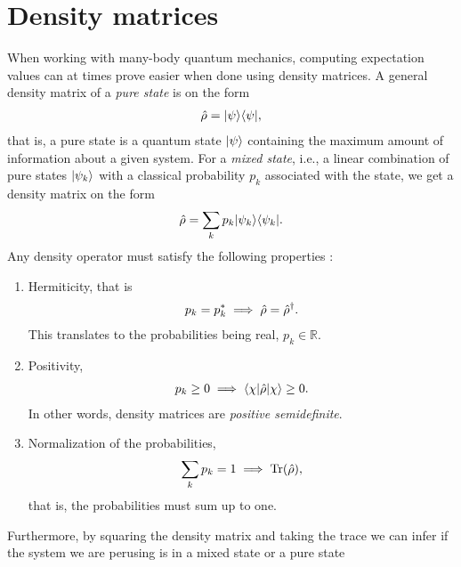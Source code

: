     \section{Density matrices}
        When working with many-body quantum mechanics, computing expectation
        values can at times prove easier when done using density matrices. A
        general density matrix of a \emph{pure state} is on the form
        \begin{align}
            \hat{\rho} = | \psi \rangle\langle \psi |,
        \end{align}
        that is, a pure state is a quantum state $| \psi \rangle$ containing the
        maximum amount of information about a given system. For a \emph{mixed
        state}, i.e., a linear combination of pure states $| \psi_k \rangle$ with a
        classical probability $p_k$ associated with the state, we get a density
        matrix on the form
        \begin{align}
            \hat{\rho} = \sum_{k} p_k | \psi_k \rangle\langle \psi_k |.
        \end{align}
        Any density operator must satisfy the following
        properties \cite{modern-qm}:
        \begin{enumerate}
            \item Hermiticity, that is
                \begin{align}
                    p_k = p_k^{*} \implies \hat{\rho} = \hat{\rho}^{\dagger}.
                \end{align}
                This translates to the probabilities being real, $p_k \in
                \mathbb{R}$.
            \item Positivity,
                \begin{align}
                    p_k \geq 0 \implies \langle \chi |\hat{\rho}| \chi \rangle \geq 0.
                \end{align}
                In other words, density matrices are \emph{positive
                semidefinite}.
            \item Normalization of the probabilities,
                \begin{align}
                    \sum_{k} p_k = 1 \implies \operatorname{Tr}(\hat{\rho}),
                \end{align}
                that is, the probabilities must sum up to one.
        \end{enumerate}
        Furthermore, by squaring the density matrix and taking the trace we can
        infer if the system we are perusing is in a mixed state or a pure state
